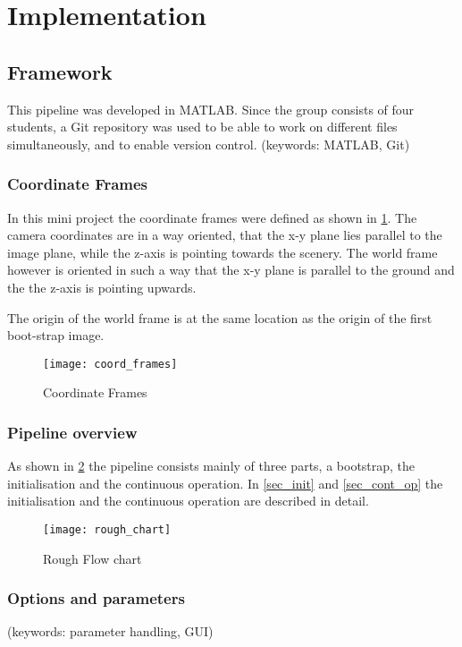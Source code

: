 \section{Implementation}

\subsection{Framework}
This pipeline was developed in MATLAB. Since the group consists of four students, a Git repository was used to be able to work on different files simultaneously, and to enable version control.
(keywords: MATLAB, Git)

\subsubsection{Coordinate Frames}
In this mini project the coordinate frames were defined as shown in \cref{img_coord_frames}. The camera coordinates are in a way oriented, that the x-y plane lies parallel to the image plane, while the z-axis is pointing towards the scenery. The world frame however is oriented in such a way that the x-y plane is parallel to the ground and the the z-axis is pointing upwards.

The origin of the world frame is at the same location as the origin of the first boot-strap image.

\begin{figure}[ht]
	\centering
	\texttt{[image: coord\_frames]}
	\caption{Coordinate Frames}
	\label{img_coord_frames}
\end{figure}

\subsubsection{Pipeline overview}

As shown in \cref{img_flow_rough} the pipeline consists mainly of three parts, a bootstrap, the initialisation and the continuous operation. In \cref{sec_init} and \cref{sec_cont_op} the initialisation and the continuous operation are described in detail.

\begin{figure}[ht]
	\centering
	\texttt{[image: rough\_chart]}
	\caption{Rough Flow chart}
	\label{img_flow_rough}
\end{figure}
%
\subsubsection{Options and parameters}
(keywords: parameter handling, GUI)



\clearpage{\pagestyle{plain}\cleardoublepage}

\clearpage{\pagestyle{plain}\cleardoublepage}